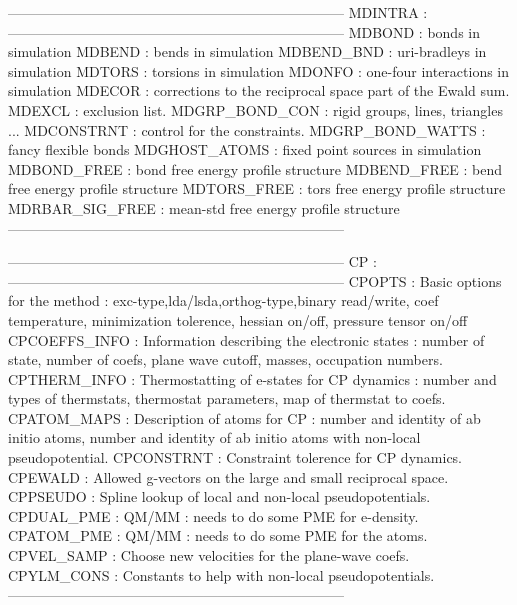 ------------------------------------------------------------------------
MDINTRA :
------------------------------------------------------------------------
 MDBOND           : bonds in simulation
 MDBEND           : bends in simulation
 MDBEND_BND       : uri-bradleys in simulation
 MDTORS           : torsions in simulation
 MDONFO           : one-four interactions in simulation
 MDECOR           : corrections to the reciprocal space part of the 
                    Ewald sum.
 MDEXCL           : exclusion list.
 MDGRP_BOND_CON   : rigid groups, lines, triangles ...
 MDCONSTRNT       : control for the constraints.
 MDGRP_BOND_WATTS : fancy flexible bonds
 MDGHOST_ATOMS    : fixed point sources in simulation
 MDBOND_FREE      : bond free energy profile structure
 MDBEND_FREE      : bend free energy profile structure
 MDTORS_FREE      : tors free energy profile structure
 MDRBAR_SIG_FREE  : mean-std free energy profile structure
------------------------------------------------------------------------


------------------------------------------------------------------------
CP :
------------------------------------------------------------------------
 CPOPTS        : Basic options for the method :
                    exc-type,lda/lsda,orthog-type,binary read/write,
                    coef temperature, minimization tolerence, hessian on/off,
                    pressure tensor on/off
 CPCOEFFS_INFO : Information describing the electronic states :
                    number of state, number of coefs, plane wave cutoff,
                    masses, occupation numbers.
 CPTHERM_INFO  : Thermostatting of e-states for CP dynamics :
                     number and types of thermstats, thermostat parameters,
                     map of thermstat to coefs.
 CPATOM_MAPS   : Description of atoms for CP :
                     number and identity of ab initio atoms,
                     number and identity of ab initio atoms with non-local
                     pseudopotential.
 CPCONSTRNT    : Constraint tolerence for CP dynamics.
 CPEWALD       : Allowed g-vectors on the large and small reciprocal space.
 CPPSEUDO      : Spline lookup of local and non-local pseudopotentials.
 CPDUAL_PME    : QM/MM : needs to do some PME for e-density.
 CPATOM_PME    : QM/MM : needs to do some PME for the atoms.
 CPVEL_SAMP    : Choose new velocities for the plane-wave coefs.
 CPYLM_CONS    : Constants to help with non-local pseudopotentials.
------------------------------------------------------------------------

